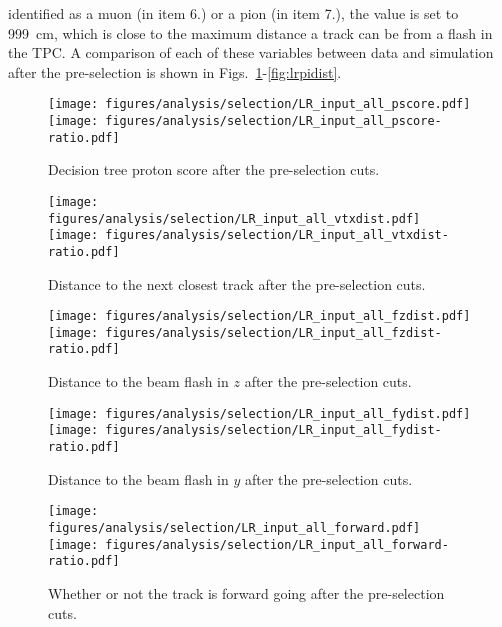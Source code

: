     identified as a muon (in item 6.) or a pion (in item 7.), the value is set
    to 999~cm, which is close to the maximum distance a track can be from a
    flash in the TPC. A comparison of each of these variables between data and
    simulation after the pre-selection is shown in
    Figs.~\ref{fig:lrpid}-\ref{fig:lrpidist}.
    \begin{figure}[ht]
      \centering
      \texttt{[image: figures/analysis/selection/LR\_input\_all\_pscore.pdf]} \\
      \texttt{[image: figures/analysis/selection/LR\_input\_all\_pscore-ratio.pdf]}
      \caption{Decision tree proton score after the pre-selection cuts.}
      \label{fig:lrpid}
    \end{figure}
    \begin{figure}[ht]
      \centering
      \texttt{[image: figures/analysis/selection/LR\_input\_all\_vtxdist.pdf]} \\
      \texttt{[image: figures/analysis/selection/LR\_input\_all\_vtxdist-ratio.pdf]}
      \caption{Distance to the next closest track after the pre-selection cuts.}
      \label{fig:lrvtxdist}
    \end{figure}
    \begin{figure}[ht]
      \centering
      \texttt{[image: figures/analysis/selection/LR\_input\_all\_fzdist.pdf]} \\
      \texttt{[image: figures/analysis/selection/LR\_input\_all\_fzdist-ratio.pdf]}
      \caption{Distance to the beam flash in $z$ after the
        pre-selection cuts.}
      \label{fig:lrfzdist}
    \end{figure}
    \begin{figure}[ht]
      \centering
      \texttt{[image: figures/analysis/selection/LR\_input\_all\_fydist.pdf]} \\
      \texttt{[image: figures/analysis/selection/LR\_input\_all\_fydist-ratio.pdf]}
      \caption{Distance to the beam flash in $y$ after the
        pre-selection cuts.}
      \label{fig:lrfydist}
    \end{figure}
    \begin{figure}[ht]
      \centering
      \texttt{[image: figures/analysis/selection/LR\_input\_all\_forward.pdf]} \\
      \texttt{[image: figures/analysis/selection/LR\_input\_all\_forward-ratio.pdf]}
      \caption{Whether or not the track is forward going after the pre-selection
        cuts.}
      \label{fig:lrforward}
    \end{figure}
